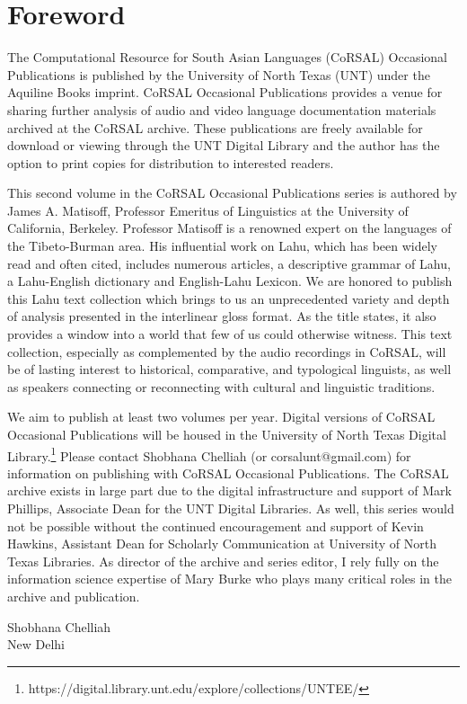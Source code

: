 \thispagestyle{empty}
\renewcommand{\thefootnote}{\arabic{footnote}}
\setcounter{footnote}{0}

\section*{Foreword}
The Computational Resource for South Asian Languages (CoRSAL)
Occasional Publications is published by the University of North Texas
(UNT) under the Aquiline Books imprint. CoRSAL Occasional Publications
provides a venue for sharing further analysis of audio and video
language documentation materials archived at the CoRSAL archive.
These publications are freely available for download or viewing
through the UNT Digital Library and the author has the option to print
copies for distribution to interested readers.

This second volume in the CoRSAL Occasional Publications series is
authored by James A. Matisoff, Professor Emeritus of Linguistics at
the University of California, Berkeley. Professor Matisoff is a
renowned expert on the languages of the Tibeto-Burman area.  His
influential work on Lahu, which has been widely read and often cited,
includes numerous articles, a descriptive grammar of Lahu, a
Lahu-English dictionary and English-Lahu Lexicon.  We are honored to
publish this Lahu text collection which brings to us an unprecedented
variety and depth of analysis presented in the interlinear gloss
format.  As the title states, it also provides a window into a world
that few of us could otherwise witness.  This text collection,
especially as complemented by the audio recordings in CoRSAL, will be
of lasting interest to historical, comparative, and typological
linguists, as well as speakers connecting or reconnecting with
cultural and linguistic traditions.

We aim to publish at least two volumes per year. Digital versions of
CoRSAL Occasional Publications will be housed in the University of
North Texas Digital Library.\footnote{https://digital.library.unt.edu/explore/collections/UNTEE/}  Please
contact Shobhana Chelliah (or corsalunt@gmail.com) for information on
publishing with CoRSAL Occasional Publications.  The CoRSAL archive
exists in large part due to the digital infrastructure and support of
Mark Phillips, Associate Dean for the UNT Digital Libraries.  As well,
this series would not be possible without the continued encouragement
and support of Kevin Hawkins, Assistant Dean for Scholarly
Communication at University of North Texas Libraries.  As director of
the archive and series editor, I rely fully on the information science
expertise of Mary Burke who plays many critical roles in the archive
and publication.

\vspace{4cm}
Shobhana Chelliah\\
New Delhi
